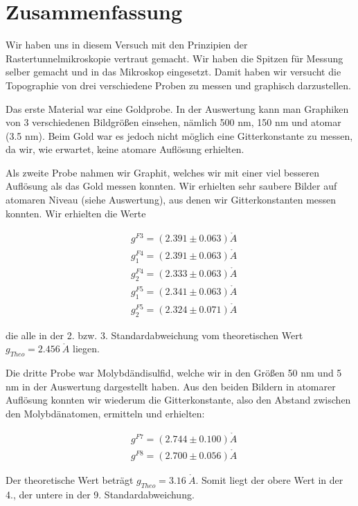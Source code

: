 \section{Zusammenfassung}

Wir haben uns in diesem Versuch mit den Prinzipien der Rastertunnelmikroskopie vertraut gemacht. Wir haben die Spitzen für Messung selber gemacht und in das Mikroskop eingesetzt. Damit haben wir versucht die Topographie von drei verschiedene Proben zu messen und graphisch darzustellen.

Das erste Material war eine Goldprobe. In der Auswertung kann man Graphiken von 3 verschiedenen Bildgrößen einsehen, nämlich 500 nm, 150 nm und atomar (3.5 nm). Beim Gold war es jedoch nicht möglich eine Gitterkonstante zu messen, da wir, wie erwartet, keine atomare Auflösung erhielten.

Als zweite Probe nahmen wir Graphit, welches wir mit einer viel besseren Auflösung als das Gold messen konnten. Wir erhielten sehr saubere Bilder auf atomaren Niveau (siehe Auswertung), aus denen wir Gitterkonstanten messen konnten. Wir erhielten die Werte

\begin{align*}	
	&g^{F3} = (2.391 \pm 0.063) \mathring{A}\\
	&g^{F4}_1 = (2.391 \pm 0.063) \mathring{A}\\
	&g^{F4}_2 = (2.333 \pm 0.063) \mathring{A}\\
	&g^{F5}_1 = (2.341 \pm 0.063) \mathring{A}\\
	&g^{F5}_2 = (2.324 \pm 0.071) \mathring{A}
\end{align*}

die alle in der 2. bzw. 3. Standardabweichung vom theoretischen Wert $g_{Theo} = 2.456\ \mathring A$ liegen.

Die dritte Probe war Molybdändisulfid, welche wir in den Größen 50 nm und 5 nm in der Auswertung dargestellt haben. Aus den beiden Bildern in atomarer Auflösung konnten wir wiederum die Gitterkonstante, also den Abstand zwischen den Molybdänatomen, ermitteln und erhielten:

\begin{align*}
	&g^{F7} = (2.744 \pm 0.100) \mathring{A}\\ 
	&g^{F8} = (2.700 \pm 0.056) \mathring{A}
\end{align*}

Der theoretische Wert beträgt $g_{Theo} = 3.16\ \mathring A$. Somit liegt der obere Wert in der 4., der untere in der 9. Standardabweichung.